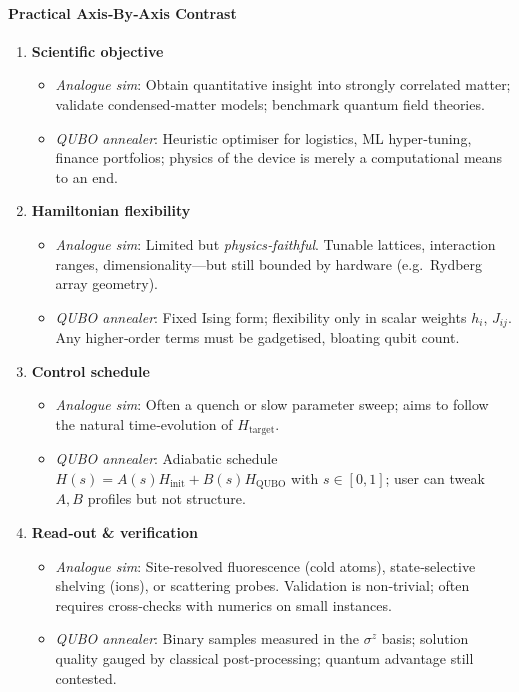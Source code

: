 \documentclass[11pt,a4paper]{article}
\begin{document}
\paragraph{Practical Axis‐By‐Axis Contrast}
\begin{enumerate}
	\item \textbf{Scientific objective}  
	\begin{itemize}
		\item \emph{Analogue sim}: Obtain quantitative insight into strongly correlated matter; validate condensed‑matter models; benchmark quantum field theories.  
		\item \emph{QUBO annealer}: Heuristic optimiser for logistics, ML hyper‑tuning, finance portfolios; physics of the device is merely a computational means to an end.
	\end{itemize}
	
	\item \textbf{Hamiltonian flexibility}  
	\begin{itemize}
		\item \emph{Analogue sim}: Limited but \emph{physics‑faithful}.  Tunable lattices, interaction ranges, dimensionality—but still bounded by hardware (e.g.\ Rydberg array geometry).  
		\item \emph{QUBO annealer}: Fixed Ising form; flexibility only in scalar weights $h_i$, $J_{ij}$.  Any higher‑order terms must be gadgetised, bloating qubit count.
	\end{itemize}
	
	\item \textbf{Control schedule}  
	\begin{itemize}
		\item \emph{Analogue sim}: Often a quench or slow parameter sweep; aims to follow the natural time‑evolution of $H_{\text{target}}$.  
		\item \emph{QUBO annealer}: Adiabatic schedule $H(s)=A(s)H_{\text{init}}+B(s)H_{\text{QUBO}}$ with $s\in[0,1]$; user can tweak $A,B$ profiles but not structure.
	\end{itemize}
	
	\item \textbf{Read‑out \& verification}  
	\begin{itemize}
		\item \emph{Analogue sim}: Site‑resolved fluorescence (cold atoms), state‑selective shelving (ions), or scattering probes.  Validation is non‑trivial; often requires cross‑checks with numerics on small instances.  
		\item \emph{QUBO annealer}: Binary samples measured in the $\sigma^z$ basis; solution quality gauged by classical post‑processing; quantum advantage still contested.
	\end{itemize}
	

\end{enumerate}
\end{document}
